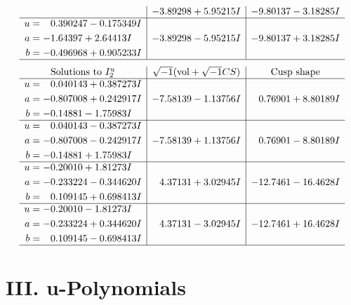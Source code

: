 \documentclass[1p]{elsarticle_modified}
\theoremstyle{definition}
\newcommand{\I}{\sqrt{-1}}
\begin{document}
$$\begin{array}{c|c|c}
 & -3.89298 + 5.95215 I & -9.80137 - 3.18285 I \\ \hline\begin{aligned}
u &= \phantom{-}0.390247 - 0.175349 I \\
a &= -1.64397 + 2.64413 I \\
b &= -0.496968 + 0.905233 I\end{aligned}
 & -3.89298 - 5.95215 I & -9.80137 + 3.18285 I\\
 \hline 
 \end{array}$$\newpage$$\begin{array}{c|c|c}  
\text{Solutions to }I^u_{2}& \I (\text{vol} + \sqrt{-1}CS) & \text{Cusp shape}\\
 \hline 
\begin{aligned}
u &= \phantom{-}0.040143 + 0.387273 I \\
a &= -0.807008 + 0.242917 I \\
b &= -0.14881 - 1.75983 I\end{aligned}
 & -7.58139 - 1.13756 I & \phantom{-}0.76901 + 8.80189 I \\ \hline\begin{aligned}
u &= \phantom{-}0.040143 - 0.387273 I \\
a &= -0.807008 - 0.242917 I \\
b &= -0.14881 + 1.75983 I\end{aligned}
 & -7.58139 + 1.13756 I & \phantom{-}0.76901 - 8.80189 I \\ \hline\begin{aligned}
u &= -0.20010 + 1.81273 I \\
a &= -0.233224 - 0.344620 I \\
b &= \phantom{-}0.109145 + 0.698413 I\end{aligned}
 & \phantom{-}4.37131 + 3.02945 I & -12.7461 - 16.4628 I \\ \hline\begin{aligned}
u &= -0.20010 - 1.81273 I \\
a &= -0.233224 + 0.344620 I \\
b &= \phantom{-}0.109145 - 0.698413 I\end{aligned}
 & \phantom{-}4.37131 - 3.02945 I & -12.7461 + 16.4628 I\\
 \hline 
 \end{array}$$\newpage
\newpage\renewcommand{\arraystretch}{1}
\centering \section*{ III. u-Polynomials}
\end{document}
